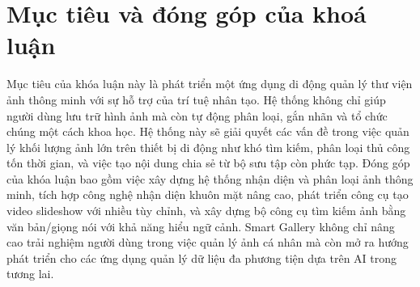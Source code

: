 \section{Mục tiêu và đóng góp của khoá luận}

Mục tiêu của khóa luận này là phát triển một ứng dụng di động quản lý thư viện ảnh thông minh với sự hỗ trợ của trí tuệ nhân tạo. Hệ thống không chỉ giúp người dùng lưu trữ hình ảnh mà còn tự động phân loại, gắn nhãn và tổ chức chúng một cách khoa học. Hệ thống này sẽ giải quyết các vấn đề trong việc quản lý khối lượng ảnh lớn trên thiết bị di động như khó tìm kiếm, phân loại thủ công tốn thời gian, và việc tạo nội dung chia sẻ từ bộ sưu tập còn phức tạp. Đóng góp của khóa luận bao gồm việc xây dựng hệ thống nhận diện và phân loại ảnh thông minh, tích hợp công nghệ nhận diện khuôn mặt nâng cao, phát triển công cụ tạo video slideshow với nhiều tùy chỉnh, và xây dựng bộ công cụ tìm kiếm ảnh bằng văn bản/giọng nói với khả năng hiểu ngữ cảnh. Smart Gallery không chỉ nâng cao trải nghiệm người dùng trong việc quản lý ảnh cá nhân mà còn mở ra hướng phát triển cho các ứng dụng quản lý dữ liệu đa phương tiện dựa trên AI trong tương lai.
